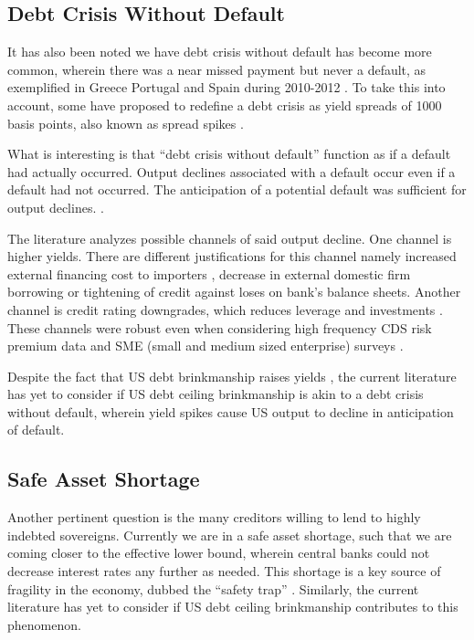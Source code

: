 \documentclass[
  12pt]{article}
\begin{document}
\hypertarget{debt-crisis-without-default}{%
\subsection{Debt Crisis Without
Default}\label{debt-crisis-without-default}}

It has also been noted we have debt crisis without default has become
more common, wherein there was a near missed payment but never a
default, as exemplified in Greece Portugal and Spain during 2010-2012
\citep{mitchener2023}. To take this into account, some have proposed to
redefine a debt crisis as yield spreads of 1000 basis points, also known
as spread spikes \citep{broner2013, aguiar, krishnamurthy}.

What is interesting is that ``debt crisis without default'' function as
if a default had actually occurred. Output declines associated with a
default occur even if a default had not occurred. The anticipation of a
potential default was sufficient for output declines.
\citep{yeyati2011}.

The literature analyzes possible channels of said output decline. One
channel is higher yields. There are different justifications for this
channel namely increased external financing cost to importers
\citep{mendoza2012}, decrease in external domestic firm
borrowing\citep{corsetti2012, das2010, gourinchas2016} or tightening of
credit against loses on bank's balance
sheets\citep{arellano, ferrando2017}. Another channel is credit rating
downgrades, which reduces leverage and investments \citep{almeida2017}.
These channels were robust even when considering high frequency CDS risk
premium data and SME (small and medium sized enterprise) surveys
\citep{brutti2015, bahaj2020, almeida2017}.

Despite the fact that US debt brinkmanship raises yields
\citep{nippani2017}, the current literature has yet to consider if US
debt ceiling brinkmanship is akin to a debt crisis without default,
wherein yield spikes cause US output to decline in anticipation of
default.

\hypertarget{safe-asset-shortage}{%
\subsection{Safe Asset Shortage}\label{safe-asset-shortage}}

Another pertinent question is the many creditors willing to lend to
highly indebted sovereigns. Currently we are in a safe asset shortage,
such that we are coming closer to the effective lower bound, wherein
central banks could not decrease interest rates any further as needed.
This shortage is a key source of fragility in the economy, dubbed the
``safety trap'' \citep{caballero2017} . Similarly, the current
literature has yet to consider if US debt ceiling brinkmanship
contributes to this phenomenon.
\end{document}
